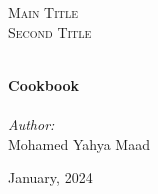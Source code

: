 
\begin{titlepage}
    \vbox{ }
    \vbox{ }
    \begin{center}

        \textsc{\LARGE Main Title}\\[1.5cm]
        \textsc{\Large Second Title}\\[0.5cm]
        \vbox{ }

        \HRule \\[0.4cm]
        { \huge \bfseries Cookbook}\\[0.4cm]
        \HRule \\[1.5cm]

        \large
        \emph{Author:}\\
        Mohamed Yahya Maad
        \vfill

        {\large January, 2024}

    \end{center}
\end{titlepage}
